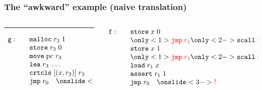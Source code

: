 \documentclass{beamer}
\newcommand{\var}[1]{\mathit{#1}}
\newcommand{\pcreg}{\mathrm{pc}}
\newcommand{\stk}{\var{stk}}
\newcommand{\plaindom}[1]{\mathrm{#1}}
\newcommand{\zinstr}[1]{\mathtt{#1}}
\newcommand{\oneinstr}[2]{\zinstr{#1} \; #2}
\newcommand{\jmp}[1]{\oneinstr{jmp}{#1}}
\newcommand{\twoinstr}[3]{\zinstr{#1} \; #2 \; #3}
\newcommand{\move}[2]{\twoinstr{move}{#1}{#2}}
\newcommand{\store}[2]{\twoinstr{store}{#1}{#2}}
\newcommand{\load}[2]{\twoinstr{load}{#1}{#2}}
\newcommand{\lea}[2]{\twoinstr{lea}{#1}{#2}}
\begin{document}
\begin{frame}
  \frametitle{The ``awkward'' example (naive translation)}
  \begin{columns}
    \begin{column}{0.45\textwidth}
      \scalebox{.75}{\usebox{\awkwardex}}
      \rule{\textwidth}{0.4pt}
      \[
        \begin{array}{lcl}
          \mathtt{g}:
          &  &\mathtt{malloc} \; r_2 \; 1\\
          &  &\store{r_2}{0}\\
          &  &\move{\pcreg}{r_3}\\
          &  &\lea{r_3}{\dots}\\
          &  &\mathtt{crtcls} \;[(x, r_2)] \; r_3\\
          &  &\jmp{r_0} \quad \onslide<3->{\color{red} !} 
        \end{array}
      \]
    \end{column}
    \begin{column}{0.45\textwidth}
      \[
        \begin{array}{lcl}
          \mathtt{f:}
            &  &\store{x}{0}\\
            &  &\only<1>{\color{red} \jmp{r_1}} \only<2->{\mathtt{scall} \; r_1([],[r_0,r_1])}\\
            &  &\store{x}{1}\\
            &  &\only<1>{\color{red} \jmp{r_1}} \only<2->{\mathtt{scall} \; r_1([],[r_0])}\\
            &  &\load{r_1}{x}\\
            &  &\mathtt{assert} \; r_1 \; 1\\
            &  &\jmp{r_0} \quad \onslide<3->{\color{red} !}\\
            &  &\phantom{\mathtt{scall} \; r_1([],[r_0,r_1])}
        \end{array}
      \]
    \end{column}
  \end{columns}
\end{frame}
\end{document}
